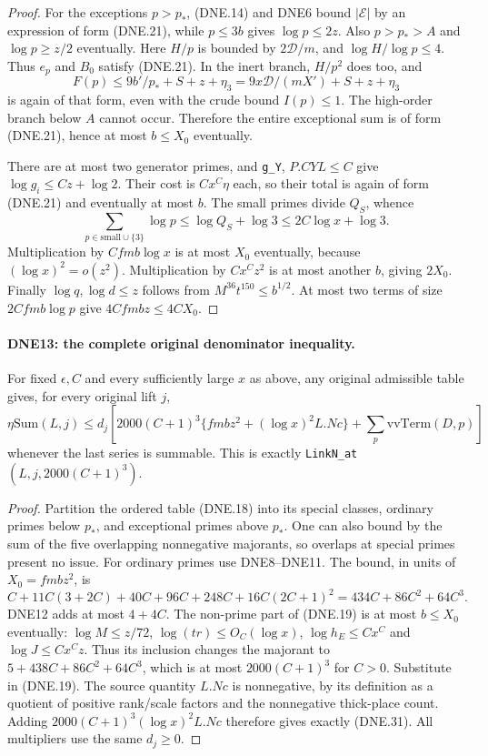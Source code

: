 \documentclass[11pt,a4paper]{article}
\numberwithin{equation}{section}
\theoremstyle{remark}\newtheorem{remark}[theorem]{Remark}
\begin{document}
\begin{proof}
For the exceptions $p>p_*$, (DNE.14) and DNE6 bound
$|\mathcal E|$ by an expression of form (DNE.21), while
$p\le3b$ gives $\log p\le2z$.  Also $p>p_*>A$ and
$\log p\ge z/2$ eventually.  Here $H/p$ is bounded by
$2\mathcal D/m$, and $\log H/\log p\le4$.
Thus $e_p$ and $B_0$ satisfy (DNE.21).  In the inert branch,
$H/p^2$ does too, and
\[
 F(p)\le9b'/p_*+S+z+\eta_3
       =9x\mathcal D/(mX')+S+z+\eta_3
\]
is again of that form, even with the crude bound $I(p)\le1$.
The high-order branch below $A$ cannot occur.  Therefore the
entire exceptional sum is of form (DNE.21), hence at most
$b\le X_0$ eventually.

There are at most two generator primes, and \texttt{g\_\allowbreak Y},
$P.CYL\le C$ give $\log g_i\le Cz+\log2$.  Their cost is
$Cx^C\eta$ each, so their total is again of form (DNE.21)
and eventually at most $b$.
The small primes divide $Q_S$, whence
\[
 \sum_{p\in\mathrm{small}\cup\{3\}}\log p
      \le\log Q_S+\log3\le2C\log x+\log3.
\]
Multiplication by $Cfm b\log x$ is at most $X_0$ eventually,
because $(\log x)^2=o(z^2)$.  Multiplication by $Cx^Cz^2$
is at most another $b$, giving $2X_0$.
Finally $\log q,\log d\le z$ follows from
$M^{36}t^{150}\le b^{1/2}$.  At most two terms of size
$2Cfm b\log p$ give $4Cfm bz\le4CX_0$.
\end{proof}

\paragraph{DNE13: the complete original denominator inequality.}
\label{claim:DNE13}
For fixed $\epsilon,C$ and every sufficiently large $x$ as above,
any original admissible table gives, for every original lift $j$,
\[
 \eta\mathrm{Sum}(L,j)
 \le d_j\left[2000(C+1)^3
       \{fm bz^2+(\log x)^2L.Nc\}
                       +\sum_p\mathrm{vvTerm}(D,p)\right]        \tag{DNE.31}
\]
whenever the last series is summable.  This is exactly
\texttt{Link\allowbreak N\_\allowbreak at}$(L,j,2000(C+1)^3)$.

\begin{proof}
Partition the ordered table (DNE.18) into its special classes,
ordinary primes below $p_*$, and exceptional primes above $p_*$.
One can also bound by the sum of the five overlapping nonnegative
majorants, so overlaps at special primes present no issue.
For ordinary primes use DNE8--DNE11.  The bound, in units of
$X_0=fm bz^2$, is
\[
 C+11C(3+2C)+40C+96C+248C+16C(2C+1)^2
                 =434C+86C^2+64C^3.                    \tag{DNE.32}
\]
DNE12 adds at most $4+4C$.
The non-prime part of (DNE.19) is at most $b\le X_0$
eventually: $\log M\le z/72$, $\log(tr)\le O_C(\log x)$,
$\log h_E\le Cx^C$ and $\log J\le Cx^Cz$.
Thus its inclusion changes the majorant to
$5+438C+86C^2+64C^3$, which is at most $2000(C+1)^3$ for $C>0$.
Substitute in (DNE.19).
The source quantity $L.Nc$ is nonnegative, by its definition
as a quotient of positive rank/scale factors and the nonnegative
thick-place count.  Adding $2000(C+1)^3(\log x)^2L.Nc$ therefore
gives exactly (DNE.31).  All multipliers use the same $d_j\ge0$.
\end{proof}
\end{document}

